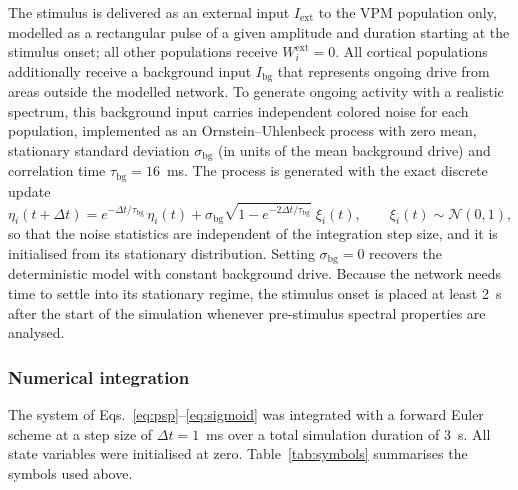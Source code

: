 \documentclass[11pt,a4paper,onecolumn]{article}
\begin{document}
The stimulus is delivered as an external input $I_{\mathrm{ext}}$ to the VPM population only, modelled as a rectangular pulse of a given amplitude and duration starting at the stimulus onset; all other populations receive $W_i^{\mathrm{ext}}=0$. All cortical populations additionally receive a background input $I_{\mathrm{bg}}$ that represents ongoing drive from areas outside the modelled network. To generate ongoing activity with a realistic spectrum, this background input carries independent colored noise for each population, implemented as an Ornstein--Uhlenbeck process with zero mean, stationary standard deviation $\sigma_{\mathrm{bg}}$ (in units of the mean background drive) and correlation time $\tau_{\mathrm{bg}}=16$~ms. The process is generated with the exact discrete update
\begin{equation}
\label{eq:ou}
\eta_i(t+\Delta t)=e^{-\Delta t/\tau_{\mathrm{bg}}}\,\eta_i(t)
+\sigma_{\mathrm{bg}}\sqrt{1-e^{-2\Delta t/\tau_{\mathrm{bg}}}}\;\xi_i(t),
\qquad \xi_i(t)\sim\mathcal{N}(0,1),
\end{equation}
so that the noise statistics are independent of the integration step size, and it is initialised from its stationary distribution. Setting $\sigma_{\mathrm{bg}}=0$ recovers the deterministic model with constant background drive. Because the network needs time to settle into its stationary regime, the stimulus onset is placed at least 2~s after the start of the simulation whenever pre-stimulus spectral properties are analysed.

\subsubsection*{Numerical integration}
\vspace{-7pt}

The system of Eqs.~\eqref{eq:psp}--\eqref{eq:sigmoid} was integrated with a forward Euler scheme at a step size of $\Delta t = 1$~ms over a total simulation duration of 3~s. All state variables were initialised at zero. Table~\ref{tab:symbols} summarises the symbols used above.
\end{document}

